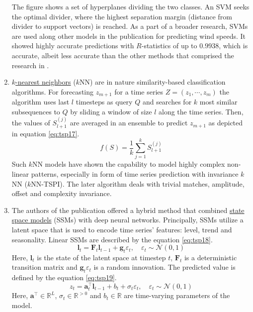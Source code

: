 \documentclass[13pt, a4paper]{article}
\begin{document}
\begin{enumerate}
The figure shows a set of hyperplanes dividing the two classes. An SVM seeks the optimal divider, where the highest separation margin (distance from divider to support vectors) is reached.
As a part of a broader research, SVMs are used along other models in the publication \cite{khosravi2018time} for predicting wind speeds. It showed highly accurate predictions with $R$-statistics of up to $0.9938$, which is accurate, albeit less accurate than the other methods that comprised the research in \cite{khosravi2018time}. 
\item \underline{$k$-nearest neighbors} ($k$NN) are in nature similarity-based classification algorithms. For forecasting $z_{m+1}$ for a time series $Z = (z_1, \cdots, z_m)$ the algorithm uses last $l$ timesteps as query $Q$ and searches for $k$ most similar subsequences to $Q$ by sliding a window of size $l$ along the time series. Then, the values of $S_{l+1}^{(j)}$ are averaged in an ensemble to predict $z_{m+1}$ as depicted in equation \ref{eq:tsp17}.
\begin{equation} \label{eq:tsp17}
f(S) = \frac{1}{k} \sum_{j=1}^k S_{l+1}^{(j)}
\end{equation}
Such $k$NN models have shown the capability to model highly complex non-linear patterns, especially in form of time series prediction with invariance $k$NN ($k$NN-TSPI). The later algorithm deals with trivial matches, amplitude, offset and complexity invariance.
\item The authors of the publication \cite{rangapuram2018deep} offered a hybrid method that combined \underline{state space models} (SSMs) with deep neural networks. Principally, SSMs utilize a latent space that is used to encode time series' features: level, trend and seasonality. Linear SSMs are described by the equation \ref{eq:tsp18}.
\begin{equation} \label{eq:tsp18}
\mathbf{l}_t = \mathbf{F}_t\mathbf{l}_{t-1} + \mathbf{g}_t \varepsilon_t, \quad \varepsilon_t \sim \mathcal{N} (0,1)
\end{equation}
Here, $\mathbf{l}_t$ is the state of the latent space at timestep $t$, $\mathbf{F}_t$ is a deterministic transition matrix and $\mathbf{g}_t \varepsilon_t$ is a random innovation. The predicted value is defined by the equation \ref{eq:tsp19}.
\begin{equation} \label{eq:tsp19}
z_t = \mathbf{a}_t^\top \mathbf{l}_{t-1} + b_t + \sigma_t \varepsilon_t, \quad \varepsilon_t \sim \mathcal{N} (0,1)
\end{equation}
Here, $\mathbf{a}^\top \in \mathbb{R}^L$, $\sigma_t \in\mathbb{R}^{>0}$ and $b_t \in \mathbb{R}$ are time-varying parameters of the model.

\end{enumerate}
\end{document}
